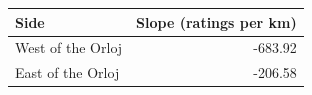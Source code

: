 \begingroup\footnotesize
\begin{tabular}{lr}
  \toprule
Side & Slope (ratings per km) \\ 
  \midrule
West of the Orloj & -683.92 \\ 
  East of the Orloj & -206.58 \\ 
   \bottomrule
\end{tabular}
\endgroup
